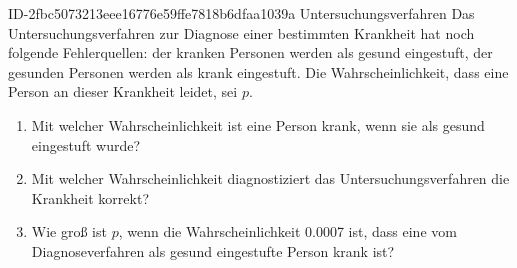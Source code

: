 \begin{exercise}
      {ID-2fbc5073213eee16776e59ffe7818b6dfaa1039a}
      {Untersuchungsverfahren}
  \ifproblem\problem
    Das Untersuchungsverfahren zur Diagnose einer bestimmten Krankheit hat
    noch folgende Fehlerquellen:  der kranken Personen werden als
    gesund eingestuft,  der gesunden Personen werden als krank eingestuft.
    Die Wahrscheinlichkeit, dass eine Person an dieser Krankheit leidet, sei $p$.
    \begin{enumerate}
      \item Mit welcher Wahrscheinlichkeit ist eine Person krank,
            wenn sie als gesund eingestuft wurde?
      \item Mit welcher Wahrscheinlichkeit diagnostiziert das Untersuchungsverfahren
            die Krankheit korrekt?
      \item Wie groß ist $p$, wenn die Wahrscheinlichkeit \num{0.0007} ist, dass
            eine vom Diagnoseverfahren als gesund eingestufte Person krank ist?
    \end{enumerate}
  \fi
\end{exercise}
